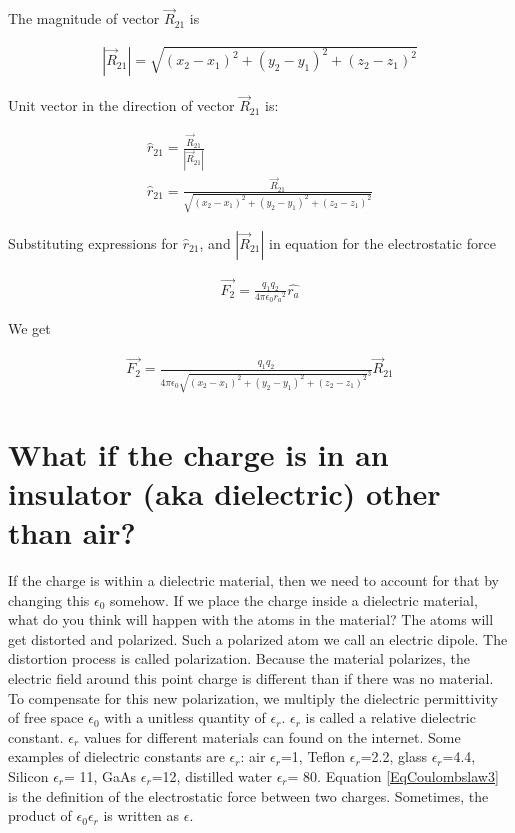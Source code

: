 \documentclass{ximera}
\begin{document}
\begin{example}
\begin{explanation}
The magnitude of vector $\vec{R}_{21}$ is


\begin{eqnarray}
|\vec{R}_{21}|= \sqrt{(x_2 - x_1)^2 +(y_2 - y_1)^2 +(z_2 - z_1)^2}
\end{eqnarray}

Unit vector in the direction of vector $\vec{R}_{21}$ is:


\begin{eqnarray}
\hat{r}_{21}= \frac{\vec{R}_{21}}{|\vec{R}_{21}|} \\
\hat{r}_{21}=\frac{\vec{R}_{21}}{\sqrt{(x_2 - x_1)^2 +(y_2 - y_1)^2 +(z_2 - z_1)^2}}
\end{eqnarray}

Substituting expressions for $\hat{r}_{21}$, and $|\vec{R}_{21}|$ in equation for the electrostatic force 

\begin{eqnarray}
\vec{F_2}=\frac{q_1 q_2}{4 \pi \epsilon_{0} {r_a}^2} \hat{r_a}
\end{eqnarray}

 

 
We get


\begin{eqnarray}
\vec{F_2}=\frac{q_1 q_2}{4 \pi \epsilon_{0} {\sqrt{(x_2 - x_1)^2 +(y_2 - y_1)^2 +(z_2 - z_1)^2}
}^3} \vec{R}_{21} \label{eqonecharge}
\end{eqnarray}







\end{explanation}


\end{example}




\section{What if the charge is in an insulator (aka dielectric) other than air?} 

If the charge is within a dielectric material, then we need to account for that by changing this $\epsilon_0$ somehow. If we place the charge inside a dielectric material, what do you think will happen with the atoms in the material? The atoms will get distorted and polarized. Such a polarized atom we call an electric dipole. The distortion process is called polarization. Because the material polarizes, the electric field around this point charge is different than if there was no material. To compensate for this new polarization, we multiply the dielectric permittivity of free space $\epsilon_0$ with a unitless quantity of $\epsilon_r$.  $\epsilon_r$ is called a relative dielectric constant. $\epsilon_r$ values for different materials can found on the internet. Some examples of dielectric constants are $\epsilon_r$: air $\epsilon_r$=1,  Teflon $\epsilon_r$=2.2, glass $\epsilon_r$=4.4, Silicon $\epsilon_r$= 11, GaAs $\epsilon_r$=12, distilled water $\epsilon_r$= 80.  Equation \ref{EqCoulombslaw3} is the definition of the electrostatic force between two charges. Sometimes, the product of $\epsilon_0 \epsilon_r$ is written as $\epsilon$.
\end{document}
